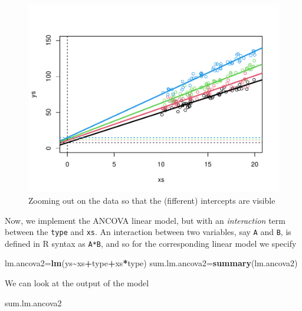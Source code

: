 \documentclass[
]{book}
\newenvironment{Shaded}{\begin{snugshade}}{\end{snugshade}}
\newcommand{\FunctionTok}[1]{\textcolor[rgb]{0.13,0.29,0.53}{\textbf{#1}}}
\newcommand{\NormalTok}[1]{#1}
\newcommand{\OtherTok}[1]{\textcolor[rgb]{0.56,0.35,0.01}{#1}}
\newcommand{\SpecialCharTok}[1]{\textcolor[rgb]{0.81,0.36,0.00}{\textbf{#1}}}
\begin{document}
\begin{figure}

{\centering \includegraphics[width=0.8\linewidth]{ECOMODbook_files/figure-latex/FCR-1} 

}

\caption{Zooming out on the data so that the (fifferent) intercepts are visible}\label{fig:FCR}
\end{figure}

Now, we implement the ANCOVA linear model, but with an \emph{interaction} term between the \texttt{type} and \texttt{xs}. An interaction between two variables, say \texttt{A} and \texttt{B}, is defined in R syntax as \texttt{A*B}, and so for the corresponding linear model we specify

\begin{Shaded}
\begin{Highlighting}[]
\NormalTok{lm.ancova2}\OtherTok{=}\FunctionTok{lm}\NormalTok{(ys}\SpecialCharTok{\textasciitilde{}}\NormalTok{xs}\SpecialCharTok{+}\NormalTok{type}\SpecialCharTok{+}\NormalTok{xs}\SpecialCharTok{*}\NormalTok{type)}
\NormalTok{sum.lm.ancova2}\OtherTok{=}\FunctionTok{summary}\NormalTok{(lm.ancova2)}
\end{Highlighting}
\end{Shaded}

We can look at the output of the model

\begin{Shaded}
\begin{Highlighting}[]
\NormalTok{sum.lm.ancova2}
\end{Highlighting}
\end{Shaded}
\end{document}
